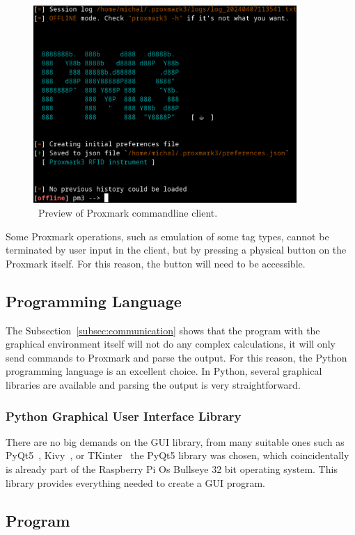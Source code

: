 \begin{figure}[ht]
  \centering
  \includegraphics[width=10cm]{text/design/pm3.png}
  \caption{~Preview of Proxmark commandline client.}
  \label{fig:pm3}
\end{figure}

Some Proxmark operations, such as emulation of some tag types, cannot be terminated by user input in the client, but by pressing a physical button on the Proxmark itself. For this reason, the button will need to be accessible.


\subsection{Programming Language}

The Subsection~\ref{subsec:communication} shows that the program with the graphical environment itself will not do any complex calculations, it will only send commands to Proxmark and parse the output. For this reason, the Python programming language is an excellent choice. In Python, several graphical libraries are available and parsing the output is very straightforward.

\subsubsection{Python Graphical User Interface Library}

There are no big demands on the GUI library, from many suitable ones such as PyQt5~\cite{pythonpyqt5}, Kivy~\cite{pythonkivy}, or TKinter~\cite{pythontkinter} the PyQt5 library was chosen, which coincidentally is already part of the Raspberry Pi Os Bullseye 32 bit operating system. This library provides everything needed to create a GUI program.


\subsection{Program}

